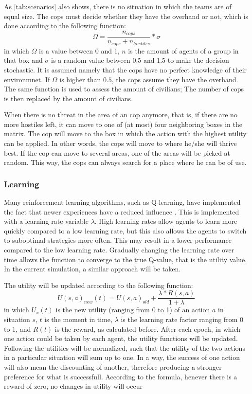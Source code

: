 As \autoref{tab:scenarios} also shows, there is no situation in which the teams are of equal size. The cops must decide whether they have the overhand or not, which is done according to the following function:
$$ \Omega = \frac{n_{cops}}{n_{cops} + n_{hostiles}}*\sigma $$
in which $\Omega$ is a value between 0 and 1, $n$ is the amount of agents of a group in that box and $\sigma$ is a random value between 0.5 and 1.5 to make the decision stochastic. It is assumed namely that the cops have no perfect knowledge of their environmnet. If $\Omega$ is higher than $0.5$, the cops assume they have the overhand. The same function is used to assess the amount of civilians; The number of cops is then replaced by the amount of civilians. 

When there is no threat in the area of an cop anymore, that is, if there are no more hostiles left, it can move to one of (at most) four neighboring boxes in the matrix. The cop will move to the box in which the action with the highest utility can be applied. In other words, the cops will move to where he/she will thrive best. If the cop can move to several areas, one of the areas will be picked at random. This way, the cops can always search for a place where he can be of use. 

\subsubsection{Learning}
Many reinforcement learning algorithms, such as Q-learning, have implemented the fact that newer experiences have a reduced influence  \citep*{watkins1992q}. This is implemented with a learning rate variable $\lambda$. High learning rates allow agents to learn more quickly compared to a low learning rate, but this also allows the agents to switch to suboptimal strategies more often. This may result in a lower performance compared to the low learning rate. Gradually changing the learning rate over time allows the function to converge to the true Q-value, that is the utility value. In the current simulation, a similar approach will be taken. 

The utility will be updated according to the following function:
$$ U(s,a)_{new}(t) = U(s,a)_{old} + \frac{\lambda * R(s,a)}{1+\lambda} $$
in which $U_x(t)$ is the new utility (ranging from 0 to 1) of an action $a$ in situation $s$, $t$ is the moment in time, $\lambda$ is the learning rate factor ranging from 0 to 1, and $R(t)$ is the reward, as calculated before. After each epoch, in which one action could be taken by each agent, the utility functions will be updated. Following the utilities will be normalized, such that the utility of the two actions in a particular situation will sum up to one. In a way, the success of one action will also mean the discounting of another, therefore producing a stronger preference for what is successfull. According to the formula, henever there is a reward of zero, no changes in utility will occur

